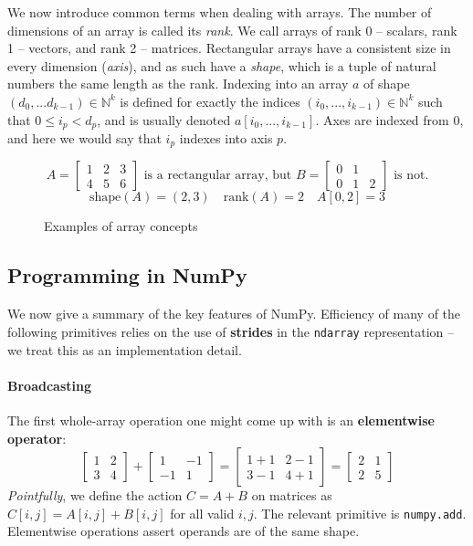 We now introduce common terms when dealing with arrays. The number of dimensions of an array is called its \textit{rank}. We call arrays of rank 0  -- scalars, rank 1 -- vectors, and rank 2 -- matrices. Rectangular arrays have a consistent size in every dimension (\textit{axis}), and as such have a \textit{shape}, which is a tuple of natural numbers the same length as the rank. Indexing into an array $a$ of shape $(d_0, ... d_{k-1}) \in \mathbb{N}^k$ is defined for exactly the indices $(i_0, ..., i_{k-1}) \in \mathbb{N}^k$ such that $0 \le i_p < d_p$, and is usually denoted $a[i_0, ..., i_{k-1}]$. Axes are indexed from 0, and here we would say that $i_p$ indexes into axis $p$.
\begin{figure}[h]
    \centering
    $$ A = \begin{bmatrix}
        1 & 2 & 3 \\ 
        4 & 5 & 6
    \end{bmatrix} \text{ is a rectangular array, but } B = \begin{bmatrix}
    0 & 1 & \\
    0 & 1 & 2
    \end{bmatrix} \text{ is not.} $$
    $$ \mathrm{shape}(A) = (2, 3)  \quad \mathrm{rank}(A) = 2 \quad A[0, 2] = 3 $$
    \caption{Examples of array concepts}
    \label{fig:array-examples}
\end{figure}

\subsection{Programming in NumPy} 

We now give a summary of the key features of NumPy. Efficiency of many of the following primitives relies on the use of \textbf{strides} in the \texttt{ndarray} representation \cite{harris2020array} -- we treat this as an implementation detail.

\paragraph{Broadcasting}

The first whole-array operation one might come up with is an \textbf{elementwise operator}:
$$ \begin{bmatrix} 1 & 2 \\ 3 & 4 \end{bmatrix} 
+ \begin{bmatrix}1 & -1 \\ -1 & 1 \end{bmatrix}
= \begin{bmatrix}1 + 1 & 2 - 1 \\ 3 - 1 & 4 + 1 \end{bmatrix}
= \begin{bmatrix}2 & 1 \\ 2 & 5 \end{bmatrix} $$
\textit{Pointfully}, we define the action $C = A + B$ on matrices as $C[i, j] = A[i, j] + B[i, j]$ for all valid $i, j$. The relevant primitive is \texttt{numpy.add}. Elementwise operations assert operands are of the same shape.

